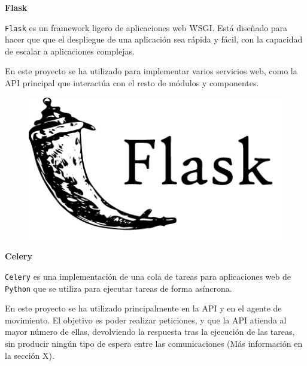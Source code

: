 \textbf{Flask}

\texttt{Flask} \cite{ref14} es un framework ligero de aplicaciones web WSGI. Está diseñado para hacer que que el despliegue de una aplicación sea rápida y fácil, con la capacidad de escalar a aplicaciones complejas.

En este proyecto se ha utilizado para implementar varios servicios web, como la API principal que interactúa con el resto de módulos y componentes.

\begin{figure}[h]
	\centering
	\includegraphics[scale=0.19]{images/13}
\end{figure}

\textbf{Celery}

\texttt{Celery} \cite{ref15} es una implementación de una cola de tareas para aplicaciones web de \texttt{Python} que se utiliza para ejecutar tareas de forma asíncrona.

En este proyecto se ha utilizado principalmente en la API y en el agente de movimiento. El objetivo es poder realizar peticiones, y que la API atienda al mayor número de ellas, devolviendo la respuesta tras la ejecución de las tareas, sin producir ningún tipo de espera entre las comunicaciones (Más información en la sección X).

\vspace{-0.6cm}

